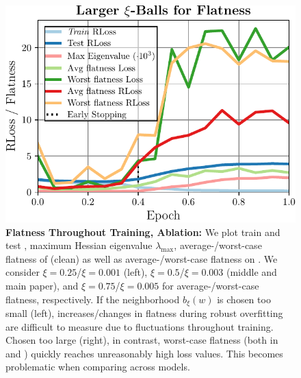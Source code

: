 \begin{figure}[t]
\begin{minipage}[t]{0.31\textwidth}
		\includegraphics[width=\textwidth]{plots_supp_flatness_epochs_large}
	\end{minipage}
	\vspace*{-6px}
	\caption{\textbf{Flatness Throughout Training, Ablation:} We plot train and test \RCE, maximum Hessian eigenvalue $\lambda_{\text{max}}$, average-/worst-case flatness of (clean) \CE as well as average-/worst-case flatness on \RCE. We consider $\xi{=}0.25$/$\xi{=}0.001$ (left), $\xi{=}0.5$/$\xi{=}0.003$ (middle and main paper), and $\xi{=}0.75$/$\xi{=}0.005$ for average-/worst-case flatness, respectively. If the neighborhood $b_\xi(w)$ is chosen too small (left), increases/changes in flatness during robust overfitting are difficult to measure due to fluctuations throughout training. Chosen too large (right), in contrast, worst-case flatness (both in \CE and \RCE) quickly reaches unreasonably high loss values. This becomes problematic when comparing across models.}
	\label{fig:supp-flatness-epochs}
	\vspace*{-6px}
\end{figure}

